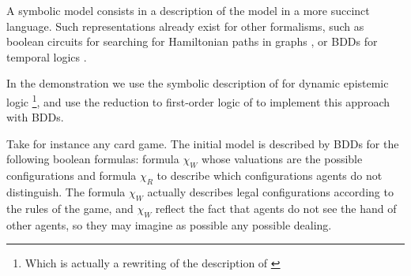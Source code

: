 A symbolic model consists in a description of the model in a more succinct language. Such representations already exist for other formalisms, such as boolean circuits for searching for Hamiltonian paths in graphs \cite{papadimitriou2003computational}, or BDDs for temporal logics \cite{DBLP:conf/lics/BurchCMDH90}.

In the demonstration we use the symbolic description of \cite{DBLP:conf/aiml/CharrierS18} for dynamic epistemic logic \footnote{Which is actually a rewriting of the description of \cite{DBLP:conf/atal/CharrierS17}}, and use the reduction to first-order logic of \cite{DBLP:conf/tableaux/CharrierPS17} to implement this approach with BDDs.

Take for instance any card game. The initial model is described by BDDs for the following boolean formulas: formula $\chi_W$  whose valuations are the possible configurations and formula $\chi_R$ to describe which configurations agents do not distinguish. The formula $\chi_W$ actually describes legal configurations according to the rules of the game, and $\chi_W$ reflect the fact that agents do not see the hand of other agents, so they may imagine as possible any possible dealing.
